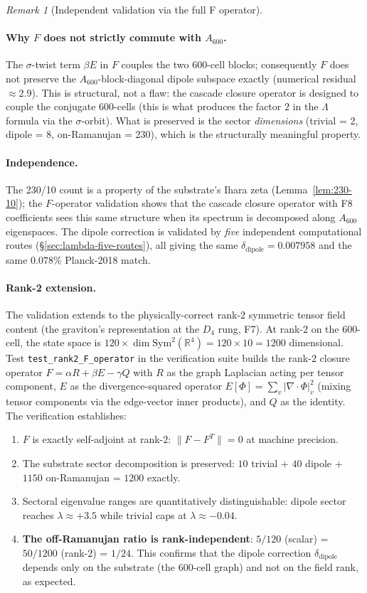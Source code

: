 \documentclass[11pt]{article}
\theoremstyle{plain}
\theoremstyle{definition}
\theoremstyle{remark}
\newtheorem{remark}[theorem]{Remark}
\newcommand{\Sym}{\mathrm{Sym}}
\begin{document}
\begin{remark}[Independent validation via the full F operator]
\paragraph{Why $F$ does not strictly commute with $A_{600}$.} The $\sigma$-twist term $\beta E$ in $F$ couples the two 600-cell blocks; consequently $F$ does not preserve the $A_{600}$-block-diagonal dipole subspace exactly (numerical residual $\approx 2.9$). This is structural, not a flaw: the cascade closure operator is designed to couple the conjugate 600-cells (this is what produces the factor $2$ in the $\Lambda$ formula via the $\sigma$-orbit). What is preserved is the sector \emph{dimensions} (trivial = 2, dipole = 8, on-Ramanujan = 230), which is the structurally meaningful property.

\paragraph{Independence.} The 230/10 count is a property of the substrate's Ihara zeta (Lemma~\ref{lem:230-10}); the $F$-operator validation shows that the cascade closure operator with F8 coefficients sees this same structure when its spectrum is decomposed along $A_{600}$ eigenspaces. The dipole correction is validated by \emph{five} independent computational routes (\S\ref{sec:lambda-five-routes}), all giving the same $\delta_\mathrm{dipole} = 0.007958$ and the same $0.078\%$ Planck-2018 match.

\paragraph{Rank-2 extension.} The validation extends to the physically-correct rank-$2$ symmetric tensor field content (the graviton's representation at the $D_4$ rung, F7). At rank-$2$ on the 600-cell, the state space is $120 \times \dim \Sym^2(\mathbb{R}^4) = 120 \times 10 = 1200$ dimensional. Test \texttt{test\_rank2\_F\_operator} in the verification suite builds the rank-$2$ closure operator $F = \alpha R + \beta E - \gamma Q$ with $R$ as the graph Laplacian acting per tensor component, $E$ as the divergence-squared operator $E[\Phi] = \sum_v |\nabla \cdot \Phi|^2_v$ (mixing tensor components via the edge-vector inner products), and $Q$ as the identity. The verification establishes:
\begin{enumerate}[leftmargin=2em]
\item $F$ is exactly self-adjoint at rank-$2$: $\|F - F^T\| = 0$ at machine precision.
\item The substrate sector decomposition is preserved: $10$ trivial + $40$ dipole + $1150$ on-Ramanujan = $1200$ exactly.
\item Sectoral eigenvalue ranges are quantitatively distinguishable: dipole sector reaches $\lambda \approx +3.5$ while trivial caps at $\lambda \approx -0.04$.
\item \textbf{The off-Ramanujan ratio is rank-independent}: $5/120$ (scalar) = $50/1200$ (rank-$2$) = $1/24$. This confirms that the dipole correction $\delta_\mathrm{dipole}$ depends only on the substrate (the 600-cell graph) and not on the field rank, as expected.
\end{enumerate}

\end{remark}
\end{document}

